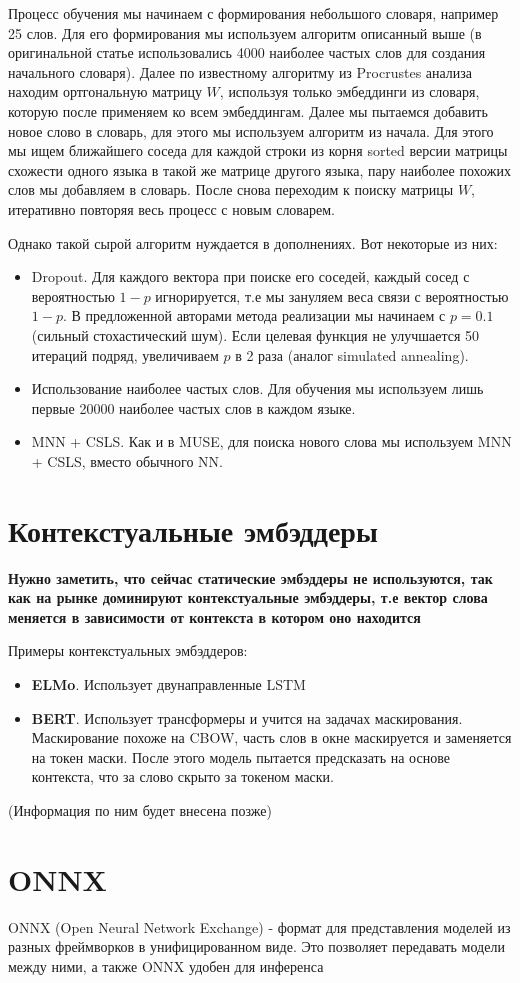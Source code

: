 \documentclass{article}
\begin{document}
    Процесс обучения мы начинаем с формирования небольшого словаря, например 25 слов. Для его формирования мы используем алгоритм описанный выше 
    (в оригинальной статье использовались 4000 наиболее частых слов для создания начального словаря). 
    Далее по известному алгоритму из Procrustes анализа находим 
    ортгональную матрицу $W$, используя только эмбеддинги из словаря, которую после применяем ко всем эмбеддингам. 
    Далее мы пытаемся добавить новое слово 
    в словарь, для этого мы используем алгоритм из начала. 
    Для этого мы ищем ближайшего соседа для каждой строки из корня sorted версии матрицы схожести 
    одного языка в такой же матрице другого языка, пару наиболее похожих слов мы добавляем в словарь. 
    После снова переходим к поиску матрицы $W$, итеративно повторяя весь процесс с новым словарем.

    Однако такой сырой алгоритм нуждается в дополнениях. Вот некоторые из них: 

    \begin{itemize}
        \item Dropout. Для каждого вектора при поиске его соседей, каждый сосед с вероятностью 
        $1 - p$ игнорируется, т.е мы зануляем веса связи с вероятностью $1 - p$. В предложенной авторами метода
        реализации мы начинаем с $p = 0.1$ (сильный стохастический шум). Если целевая функция не улучшается 50 итераций подряд, 
        увеличиваем $p$ в 2 раза (аналог simulated annealing). 
        \item Использование наиболее частых слов. Для обучения мы используем лишь первые 
        20000 наиболее частых слов в каждом языке.
        \item MNN + CSLS. Как и в MUSE, для поиска нового слова мы используем MNN + CSLS, вместо обычного NN.
    \end{itemize}

    \section{Контекстуальные эмбэддеры} 

    \textbf{
        Нужно заметить, что сейчас статические эмбэддеры 
        не используются, так как на рынке доминируют контекстуальные эмбэддеры,
        т.е вектор слова меняется в зависимости от контекста в котором оно находится
    }

    \quad  

    Примеры контекстуальных эмбэддеров:
    \begin{itemize}
        \item \textbf{ELMo}. Использует двунаправленные LSTM 
        \item \textbf{BERT}. Использует трансформеры и учится на задачах маскирования.
        Маскирование похоже на CBOW, часть слов в окне маскируется и заменяется на токен маски.
        После этого модель пытается предсказать на основе контекста, что за слово скрыто за токеном маски.  
    \end{itemize} 

    (Информация по ним будет внесена позже)


    \section{ONNX}

    ONNX (Open Neural Network Exchange) - формат для представления моделей из разных фреймворков в унифицированном виде.
    Это позволяет передавать модели между ними, а также ONNX удобен для инференса 
\end{document}
